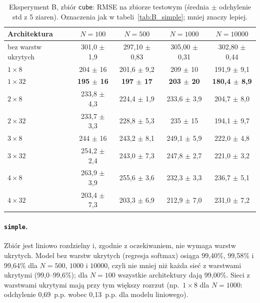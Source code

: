 \documentclass[11pt,a4paper]{article}
\begin{document}
	\begin{table}[H]
		\centering
		\footnotesize
		\caption{Eksperyment B, zbiór \texttt{cube}: RMSE na zbiorze testowym (średnia $\pm$ odchylenie std z 5 ziaren). Oznaczenia jak w tabeli~\ref{tab:B_simple}; mniej znaczy lepiej.}\label{tab:B_cube}
		\begin{tabular}{@{}lcccc@{}}
			\toprule
			Architektura & $N=100$ & $N=500$ & $N=1000$ & $N=10000$ \\
			\midrule
			bez warstw ukrytych & 301,0 $\pm$ 1,9 & 297,10 $\pm$ 0,83 & 305,00 $\pm$ 0,31 & 302,80 $\pm$ 0,44 \\
			$1\times8$ & 204 $\pm$ 16 & 201,6 $\pm$ 9,2 & 209 $\pm$ 10 & 191,9 $\pm$ 9,1 \\
			$1\times32$ & \textbf{195 $\pm$ 16} & \textbf{197 $\pm$ 17} & \textbf{203 $\pm$ 20} & \textbf{180,4 $\pm$ 8,9} \\
			$2\times8$ & 233,8 $\pm$ 4,3 & 224,4 $\pm$ 1,9 & 233,6 $\pm$ 3,9 & 204,7 $\pm$ 8,0 \\
			$2\times32$ & 233,7 $\pm$ 3,3 & 228,8 $\pm$ 5,3 & 235 $\pm$ 15 & 194,1 $\pm$ 9,7 \\
			$3\times8$ & 244 $\pm$ 16 & 243,2 $\pm$ 8,1 & 249,1 $\pm$ 5,9 & 222,0 $\pm$ 4,8 \\
			$3\times32$ & 254,2 $\pm$ 2,4 & 243,0 $\pm$ 7,3 & 247,8 $\pm$ 2,7 & 221,0 $\pm$ 3,2 \\
			$4\times8$ & 263,9 $\pm$ 3,9 & 255,6 $\pm$ 3,6 & 232,3 $\pm$ 3,3 & 236,7 $\pm$ 5,1 \\
			$4\times32$ & 203,4 $\pm$ 7,3 & 203,3 $\pm$ 6,9 & 212,9 $\pm$ 7,0 & 231,0 $\pm$ 7,2 \\
			\bottomrule
		\end{tabular}
	\end{table}
	
	\paragraph{\texttt{simple}.} Zbiór jest liniowo rozdzielny i, zgodnie z oczekiwaniem, nie wymaga warstw ukrytych. Model bez warstw ukrytych (regresja softmax) osiąga 99,40\%, 99,58\% i 99,64\% dla $N=500$, $1000$ i $10000$, czyli nie mniej niż każda sieć z warstwami ukrytymi (99,0--99,6\%); dla $N=100$ wszystkie architektury dają 99,00\%. Sieci z warstwami ukrytymi mają przy tym większy rozrzut (np.\ $1\times8$ dla $N=1000$: odchylenie 0,69~p.p. wobec 0,13~p.p. dla modelu liniowego).
	
\end{document}
